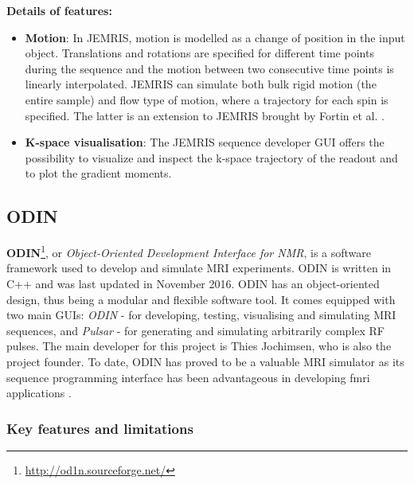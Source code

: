 \textbf{Details of features:}
\begin{itemize}
    
    \item \textbf{Motion}: In JEMRIS, motion is modelled as a change of position in the input object.
    Translations and rotations are specified for different time points during the sequence and the motion between two consecutive time points is linearly interpolated. 
    JEMRIS can simulate both bulk rigid motion (the entire sample) and flow type of motion, where a trajectory for each spin is specified. 
    The latter is an extension to JEMRIS brought by Fortin et al. \cite{Fortin2016}.
    
    \item \textbf{K-space visualisation}: The JEMRIS sequence developer GUI offers the possibility to visualize and inspect the k-space trajectory of the readout and to plot the gradient moments.

\end{itemize}

\hfill

\subsection{ODIN}
\textbf{ODIN}\footnote{\url{http://od1n.sourceforge.net/}}, or \textit{Object-Oriented Development Interface for NMR}, is a software framework used to develop and simulate MRI experiments.
ODIN is written in C++ and was last updated in November 2016.
ODIN has an object-oriented design, thus being a modular and flexible software tool.
It comes equipped with two main GUIs: \textit{ODIN} - for developing, testing, visualising and simulating MRI sequences, and \textit{Pulsar} - for generating and simulating arbitrarily complex RF pulses.
The main developer for this project is Thies Jochimsen, who is also the project founder.
To date, ODIN has proved to be a valuable MRI simulator as its sequence programming interface has been advantageous in developing \ac{fmri} applications \cite{Schafer2004}.

\hfill
    
\subsubsection{Key features and limitations}

